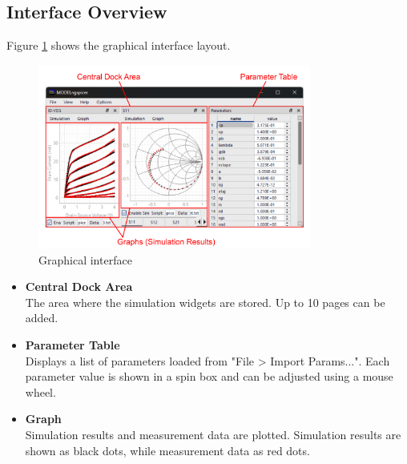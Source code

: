 \documentclass[a4paper,12pt,titlepage]{article}
\begin{document}
\subsection{Interface Overview}

Figure \ref{fig:img01} shows the graphical interface layout.

\begin{figure}[htbp]
    \centering
    \includegraphics[width=0.8\textwidth]{images/img01.pdf}
    \caption{Graphical interface}
    \label{fig:img01}
\end{figure}

\begin{itemize}
    \setlength{\parskip}{0mm}
    \setlength{\itemsep}{0mm}
    \item \textbf{Central Dock Area}\\
        The area where the simulation widgets are stored. Up to 10 pages can be added.
    \item \textbf{Parameter Table}\\
        Displays a list of parameters loaded from "File > Import Params...".
        Each parameter value is shown in a spin box and can be adjusted using a mouse wheel.
    \item \textbf{Graph}\\
        Simulation results and measurement data are plotted. Simulation results are shown as black
        dots, while measurement data as red dots.
\end{itemize}

\end{document}
